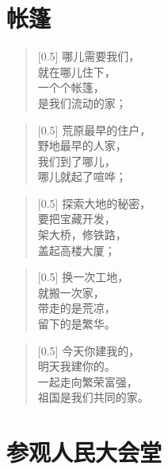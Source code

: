 \documentclass[12pt,UTF-8,openany]{ctexbook}
\begin{document}
\chapter{帐篷}

\begin{large}
    
    \begin{verse}[0.5\linewidth]
        哪儿需要我们， \\
        就在哪儿住下， \\
        一个个帐篷， \\
        是我们流动的家；
    \end{verse}
    
    
    \begin{verse}[0.5\linewidth]
        荒原最早的住户， \\
        野地最早的人家， \\
        我们到了哪儿， \\
        哪儿就起了喧哗；
    \end{verse}
    
    
    \begin{verse}[0.5\linewidth]
        探索大地的秘密， \\
        要把宝藏开发， \\
        架大桥，修铁路， \\
        盖起高楼大厦；
    \end{verse}
    
    
    \begin{verse}[0.5\linewidth]
        换一次工地， \\
        就搬一次家， \\
        带走的是荒凉， \\
        留下的是繁华。
    \end{verse}
    
    
    \begin{verse}[0.5\linewidth]
        今天你建我的， \\
        明天我建你的。 \\
        一起走向繁荣富强， \\
        祖国是我们共同的家。
    \end{verse}
    
\end{large}



\chapter{参观人民大会堂}
\end{document}
